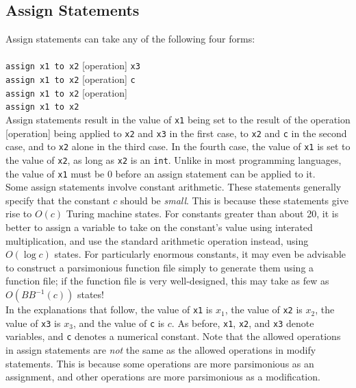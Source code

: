 \documentclass[11pt]{report}
\begin{document}
\subsection{Assign Statements}

Assign statements can take any of the following four forms: \\ \\
\texttt{assign x1 to x2} [operation] \texttt{x3} \\ 
\texttt{assign x1 to x2} [operation] \texttt{c} \\
\texttt{assign x1 to x2} [operation] \\
\texttt{assign x1 to x2} \\

Assign statements result in the value of \texttt{x1} being set to the result of the operation [operation] being applied to \texttt{x2} and \texttt{x3} in the first case, to \texttt{x2} and \texttt{c} in the second case, and to \texttt{x2} alone in the third case. In the fourth case, the value of \texttt{x1} is set to the value of \texttt{x2}, as long as \texttt{x2} is an \texttt{int}. Unlike in most programming languages, the value of \texttt{x1} must be 0 before an assign statement can be applied to it. \\

Some assign statements involve constant arithmetic. These statements generally specify that the constant $c$ should be \emph{small}. This is because these statements give rise to $O(c)$ Turing machine states. For constants greater than about 20, it is better to assign a variable to take on the constant's value using interated multiplication, and use the standard arithmetic operation instead, using $O(\log c)$ states. For particularly enormous constants, it may even be advisable to construct a parsimonious function file simply to generate them using a function file; if the function file is very well-designed, this may take as few as $O(BB^{-1}(c))$ states! \\

In the explanations that follow, the value of \texttt{x1} is $x_1$, the value of \texttt{x2} is $x_2$, the value of \texttt{x3} is $x_3$, and the value of \texttt{c} is $c$. As before, \texttt{x1}, \texttt{x2}, and \texttt{x3} denote variables, and \texttt{c} denotes a numerical constant. Note that the allowed operations in assign statements are \emph{not} the same as the allowed operations in modify statements. This is because some operations are more parsimonious as an assignment, and other operations are more parsimonious as a modification.
\end{document}
